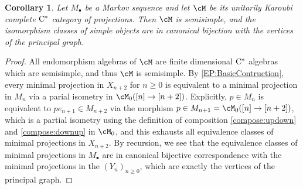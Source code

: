 \documentclass[11pt]{article}
\theoremstyle{plain}
\newtheorem{cor}[thm]{Corollary}
\theoremstyle{definition}
\newcommand{\Cstar}{\rm{C^*}}
\begin{document}
\begin{cor}
\label{cor:SemisimpleProjectionCategory}
Let $M_\bullet$ be a Markov sequence and let $\cM$ be its unitarily Karoubi complete $\Cstar$ category of projections.
Then $\cM$ is semisimple, and the isomorphism classes of simple objects are in canonical bijection with the vertices of the principal graph.
\end{cor}
\begin{proof}
All endomorphism algebras of $\cM$ are finite dimensional $\Cstar$ algebras which are semisimple, and thus $\cM$ is semisimple. By \ref{EP:BasicContruction}, every minimal projection in $X_{n+2}$ for $n\geq 0$ is equivalent to a minimal projection in $M_{n}$ via a parial isometry in $\cM_0([n] \to [n+2])$. 
Explicitly, $p\in M_n$ is equivalent to $p e_{n+1} \in M_{n+2}$ via the morphism $p\in M_{n+1} = \cM_0([n] \to [n+2])$, which is a partial isometry using the definition of composition \ref{compose:updown} and \ref{compose:downup} in $\cM_0$, and this exhausts all equivalence classes of minimal projections in $X_{n+2}$.
By recursion, we see that the equivalence classes of minimal projections in $M_\bullet$ are in canonical bijective correspondence with the minimal projections in the $(Y_n)_{n\geq 0}$, which are exactly the vertices of the principal graph.
\end{proof}
\end{document}
